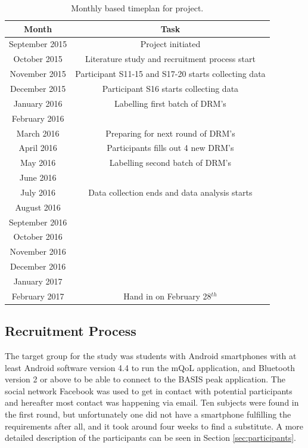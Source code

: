 \documentclass[12pt]{article} %
\begin{document}
\begin{table}[H]
\center
\begin{footnotesize}
	\begin{tabular}{| c | c |}
	\hline
	\textbf{Month} & \textbf{Task} \\
	\hline
	September 2015 & Project initiated\\
	October 2015 & Literature study and recruitment process start\\
	November 2015 & Participant S11-15 and S17-20 starts collecting data\\
	December 2015 & Participant S16 starts collecting data\\
	January 2016 & Labelling first batch of DRM's \\
	February 2016 & \\
	March 2016 & Preparing for next round of DRM's \\
	April 2016 & Participants fills out 4 new DRM's\\
	May 2016 & Labelling second batch of DRM's\\
	June 2016 & \\
	July 2016 & Data collection ends and data analysis starts\\
	August 2016 & \\
	September 2016 & \\
	October 2016 & \\
	November 2016 & \\
	December 2016 & \\
	January 2017 & \\
	February 2017 & Hand in on February 28$^{th}$\\
	\hline
	\end{tabular}
	\caption{Monthly based timeplan for project.}
	\label{tab:timeplan}
\end{footnotesize}
\end{table}



\subsection{Recruitment Process}
The target group for the study was students with Android smartphones with at least Android software version 4.4 to run the mQoL application, and Bluetooth version 2 or above to be able to connect to the BASIS peak application. The social network Facebook was used to get in contact with potential participants and hereafter most contact was happening via email. Ten subjects were found in the first round, but unfortunately one did not have a smartphone fulfilling the requirements after all, and it took around four weeks to find a substitute. A more detailed description of the participants can be seen in Section \ref{sec:participants}.
\end{document}
